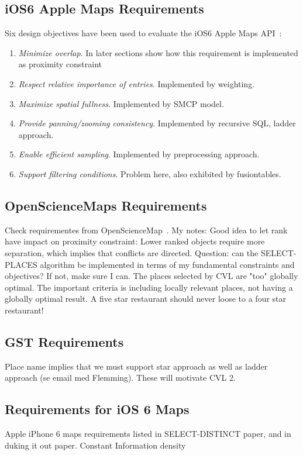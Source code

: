 \documentclass[11pt, oneside]{report}   	%
\begin{document}
\subsection{iOS6 Apple Maps Requirements}
Six design objectives have been used to evaluate the iOS6 Apple Maps API~\cite{nutanong2012multiresolution}:
\begin{enumerate}
\item \emph{Minimize overlap}. In later sections show how this requirement is implemented as proximity constraint
\item \emph{Respect relative importance of entries}. Implemented by weighting.
\item \emph{Maximize spatial fullness}. Implemented by SMCP model.
\item \emph{Provide panning/zooming consistency}. Implemented by recursive SQL, ladder approach.
\item \emph{Enable efficient sampling}. Implemented by preprocessing approach.
\item \emph{Support filtering conditions}. Problem here, also exhibited by fusiontables.
\end{enumerate}

\subsection{OpenScienceMaps Requirements}
Check requirementes from OpenScienceMap~\cite{schmid2013opensciencemap}. My notes: Good idea to let rank have impact on proximity constraint: Lower ranked objects require more separation, which implies that conflicts are directed. Question: can the SELECT-PLACES algorithm be implemented in terms of my fundamental constraints and objectives? If not, make sure I can. The places selected by CVL are "too" globally optimal. The important criteria is including locally relevant places, not having a globally optimal result. A five star restaurant should never loose to a four star restaurant!

\subsection{GST Requirements}
Place name implies that we must support star approach as well as ladder approach (se email med Flemming). These will motivate CVL 2.



\subsection{Requirements for iOS 6 Maps}
Apple iPhone 6 maps requirements listed in SELECT-DISTINCT paper, and in duking it out paper. Constant Information density
\end{document}
